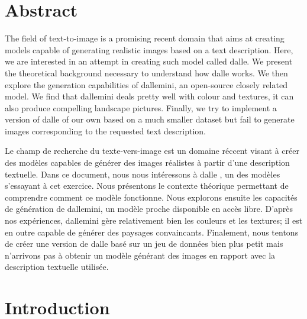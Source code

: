 \documentclass{article}
\begin{document}
\pagebreak
\section{Abstract}


\begin{paracol}{2}
The field of text-to-image is a promising recent domain that aims at creating models capable of generating realistic images based on a text description. Here, we are interested in an attempt in creating such model called \gls{dalle}. We present the theoretical background necessary to understand how \gls{dalle} works. We then explore the generation capabilities of \gls{dallemini}, an open-source closely related model. We find that \gls{dallemini} deals pretty well with colour and textures, it can also produce compelling landscape pictures. Finally, we try to implement a version of \gls{dalle} of our own based on a much smaller dataset but fail to generate images corresponding to the requested text description.

\switchcolumn

Le champ de recherche du texte-vers-image est un domaine réccent visant à créer des modèles capables de générer des images réalistes à partir d'une description textuelle. Dans ce document, nous nous intéressons à \gls{dalle} , un des modèles s'essayant à cet exercice. Nous présentons le contexte théorique permettant de comprendre comment ce modèle fonctionne. Nous explorons ensuite les capacités de génération de \gls{dallemini}, un modèle proche disponible en accès libre. D'après nos expériences, \gls{dallemini} gère relativement bien les couleurs et les textures; il est en outre capable de générer des paysages convaincants. Finalement, nous tentons de créer une version de \gls{dalle} basé sur un jeu de données bien plus petit mais n'arrivons pas à obtenir un modèle générant des images en rapport avec la description textuelle utilisée. 

\end{paracol}

\pagebreak
\section{Introduction}
\end{document}
